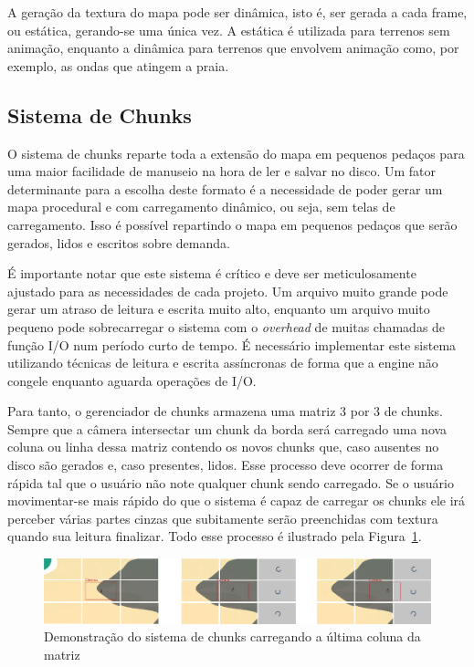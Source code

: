 \documentclass[12pt, 
openright, 
oneside, 
a4paper,    
brazil]{facom-ufu-abntex2}
\begin{document}
A geração da textura do mapa pode ser dinâmica, isto é, ser gerada a cada frame, ou estática, gerando-se uma única vez. A estática é utilizada para terrenos sem animação, enquanto a dinâmica para terrenos que envolvem animação como, por exemplo, as ondas que atingem a praia.

\subsection{Sistema de Chunks}
O sistema de chunks reparte toda a extensão do mapa em pequenos pedaços para uma maior facilidade de manuseio na hora de ler e salvar no disco. Um fator determinante para a escolha deste formato é a necessidade de poder gerar um mapa procedural e com carregamento dinâmico, ou seja, sem telas de carregamento. Isso é possível repartindo o mapa em pequenos pedaços que serão gerados, lidos e escritos sobre demanda.

É importante notar que este sistema é crítico e deve ser meticulosamente ajustado para as necessidades de cada projeto. Um arquivo muito grande pode gerar um atraso de leitura e escrita muito alto, enquanto um arquivo muito pequeno pode sobrecarregar o sistema com o \textit{overhead} de muitas chamadas de função I/O num período curto de tempo. É necessário implementar este sistema utilizando técnicas de leitura e escrita assíncronas de forma que a engine não congele enquanto aguarda operações de I/O.

Para tanto, o gerenciador de chunks armazena uma matriz 3 por 3 de chunks. Sempre que a câmera intersectar um chunk da borda será carregado uma nova coluna ou linha dessa matriz contendo os novos chunks que, caso ausentes no disco são gerados e, caso presentes, lidos. Esse processo deve ocorrer de forma rápida tal que o usuário não note qualquer chunk sendo carregado. Se o usuário movimentar-se mais rápido do que o sistema é capaz de carregar os chunks ele irá perceber várias partes cinzas que subitamente serão preenchidas com textura quando sua leitura finalizar. Todo esse processo é ilustrado pela Figura~\ref{fig:chunkSystem}.

\begin{figure}[H]
	\centering
	\includegraphics[width=38em]{imagens/chunkSystem.png}
	\caption{Demonstração do sistema de chunks carregando a última coluna da matriz}
	\label{fig:chunkSystem}
\end{figure}
\end{document}
